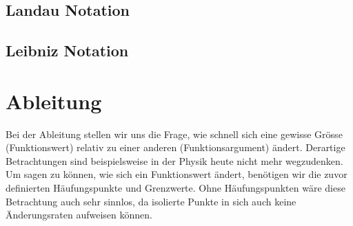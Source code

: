 \subsection{Landau Notation}\label{cha_landau_notation}
\subsection{Leibniz Notation}

\section{Ableitung}
Bei der Ableitung stellen wir uns die Frage, wie schnell sich eine gewisse Grösse (Funktionswert) relativ zu einer anderen (Funktionsargument) ändert. Derartige Betrachtungen sind beispielsweise in der Physik heute nicht mehr wegzudenken. Um sagen zu können, wie sich ein Funktionswert ändert, benötigen wir die zuvor definierten Häufungspunkte und Grenzwerte. Ohne Häufungspunkten wäre diese Betrachtung auch sehr sinnlos, da isolierte Punkte in sich auch keine Änderungsraten aufweisen können. 
